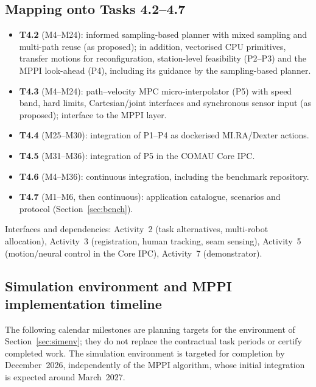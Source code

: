 \documentclass{plan4ari_report}
\begin{document}
\subsection{Mapping onto Tasks 4.2--4.7}
\begin{itemize}
\item \textbf{T4.2} (M4--M24): informed sampling-based planner with mixed sampling and multi-path reuse (as proposed); in addition, vectorised CPU primitives, transfer motions for reconfiguration, station-level feasibility (P2--P3) and the MPPI look-ahead (P4), including its guidance by the sampling-based planner.
\item \textbf{T4.3} (M4--M24): path--velocity MPC micro-interpolator (P5) with speed band, hard limits, Cartesian/joint interfaces and synchronous sensor input (as proposed); interface to the MPPI layer.
\item \textbf{T4.4} (M25--M30): integration of P1--P4 as dockerised MI.RA/Dexter actions.
\item \textbf{T4.5} (M31--M36): integration of P5 in the COMAU Core IPC.
\item \textbf{T4.6} (M4--M36): continuous integration, including the benchmark repository.
\item \textbf{T4.7} (M1--M6, then continuous): application catalogue, scenarios and protocol (Section~\ref{sec:bench}).
\end{itemize}
Interfaces and dependencies: Activity~2 (task alternatives, multi-robot allocation), Activity~3 (registration, human tracking, seam sensing), Activity~5 (motion/neural control in the Core IPC), Activity~7 (demonstrator).

\subsection{Simulation environment and MPPI implementation timeline}\label{sec:simtimeline}
The following calendar milestones are planning targets for the environment of Section~\ref{sec:simenv}; they do not replace the contractual task periods or certify completed work. The simulation environment is targeted for completion by December~2026, independently of the MPPI algorithm, whose initial integration is expected around March~2027.
\end{document}
